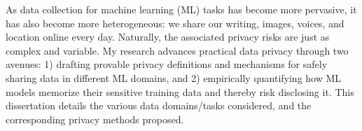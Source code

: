 \documentclass[12pt]{ucsddissertation}
\begin{document}
\begin{dissertationabstract}
As data collection for machine learning (ML) tasks has become more pervasive, it has also become more heterogeneous: we share our writing, images, voices, and location online every day. Naturally, the associated privacy risks are just as complex and variable. My research advances practical data privacy through two avenues: 1) drafting provable privacy definitions and mechanisms for safely sharing data in different ML domains, and 2) empirically quantifying how ML models memorize their sensitive training data and thereby risk disclosing it. This dissertation details the various data domains/tasks considered, and the corresponding privacy methods proposed. 
\end{dissertationabstract}

\mainmatter

\begin{dissertationintroduction}
  
\end{dissertationintroduction}

%
%
%
\end{document}
